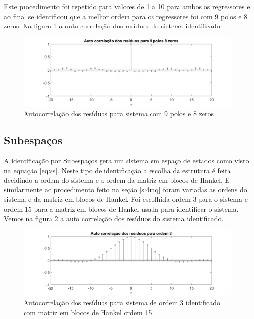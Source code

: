 Este procedimento foi repetido para valores de 1 a 10 para ambos os regressores e ao final se identificou que a melhor ordem para os regressores foi com 9 polos e 8 zeros. Na figura \ref{fig:autocorrelacao98} a auto correlação dos resíduos do sistema identificado.



\begin{figure}[H]
	\centering
	\includegraphics[width=1.1\linewidth]{autocorrelacao98}
	\caption[Autocorrelação dos resíduos para sistema com 9 polos e 8 zeros]{Autocorrelação dos resíduos para sistema com 9 polos e 8 zeros}
	\label{fig:autocorrelacao98}
\end{figure}

\subsection{Subespaços}\label{s:4subespacos}
A identificação por Subespaços gera um sistema em espaço de estados como visto na equação \ref{eq:ss}. Neste tipo de identificação a escolha da estrutura é feita decidindo a ordem do sistema e a ordem da matriz em blocos de Hankel. E similarmente ao procedimento feito na seção \ref{s:4mq} foram variadas as ordens do sistema e da matriz em blocos de Hankel.
Foi escolhida ordem 3 para o sistema e ordem 15 para a matriz em blocos de Hankel usada para identificar o sistema. Vemos na figura \ref{fig:autocorrelacao315} a auto correlação dos resíduos do sistema identificado.

\begin{figure}[H]
	\centering
	\includegraphics[width=1.1\linewidth]{autocorrelacao315}
	\caption[Autocorrelação dos resíduos para sistema de ordem 3]{Autocorrelação dos resíduos para sistema de ordem 3 identificado com matriz em blocos de Hankel ordem 15}
	\label{fig:autocorrelacao315}
\end{figure}

